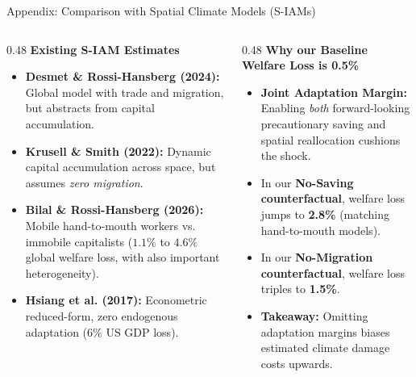 \documentclass[aspectratio=169, 10pt]{beamer}
\begin{document}
\begin{frame}{Appendix: Comparison with Spatial Climate Models (S-IAMs) \hfill \hyperlink{main:contributions}{\scriptsize{}}}\label{backup:siam_comparison}
    \begin{columns}[T]
        \begin{column}{0.48\textwidth}
            \textbf{\small Existing S-IAM Estimates}
            \vspace{0.05cm}
            \begin{itemize}\scriptsize\setlength{\itemsep}{2pt}
                \item \textbf{Desmet \& Rossi-Hansberg (2024):} Global model with trade and migration, but abstracts from capital accumulation.
                \item \textbf{Krusell \& Smith (2022):} Dynamic capital accumulation across space, but assumes \textit{zero migration}.
                \item \textbf{Bilal \& Rossi-Hansberg (2026):} Mobile hand-to-mouth workers vs. immobile capitalists ($1.1\%$ to $4.6\%$ global welfare loss, with also important heterogeneity).
                \item \textbf{Hsiang et al. (2017):} Econometric reduced-form, zero endogenous adaptation ($6\%$ US GDP loss).
            \end{itemize}
        \end{column}
        
        \begin{column}{0.48\textwidth}
            \textbf{\small Why our Baseline Welfare Loss is 0.5\%}
            \vspace{0.05cm}
            \begin{itemize}\scriptsize\setlength{\itemsep}{2pt}
                \item \textbf{Joint Adaptation Margin:} Enabling \textit{both} forward-looking precautionary saving and spatial reallocation cushions the shock.
                \item In our \textbf{No-Saving counterfactual}, welfare loss jumps to \textbf{2.8\%} (matching hand-to-mouth models).
                \item In our \textbf{No-Migration counterfactual}, welfare loss triples to \textbf{1.5\%}.
                \item \textbf{Takeaway:} Omitting adaptation margins biases estimated climate damage costs upwards.
            \end{itemize}
        \end{column}
    \end{columns}
\end{frame}
\end{document}
